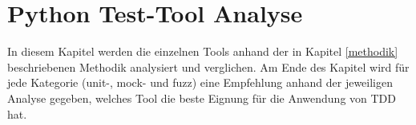 \section{Python Test-Tool Analyse}\label{python-tools}
In diesem Kapitel werden die einzelnen Tools anhand der in Kapitel 
\ref{methodik} beschriebenen Methodik analysiert und verglichen. Am Ende des 
Kapitel wird für jede Kategorie (unit-, \gls{mock}- und \gls{fuzz}) eine 
Empfehlung anhand der jeweiligen Analyse gegeben, welches Tool die beste 
Eignung für die Anwendung von TDD hat.




